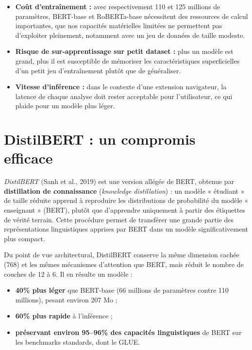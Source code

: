 ﻿\documentclass[12pt, a4paper]{report}
\begin{document}
\begin{itemize}
  \item \textbf{Coût d'entraînement :} avec respectivement 110 et 125 millions de 
        paramètres, BERT-base et RoBERTa-base nécessitent des ressources de calcul 
        importantes, que nos capacités matérielles limitées ne permettent pas 
        d'exploiter pleinement, notamment avec un jeu de données de taille modeste.
  \item \textbf{Risque de sur-apprentissage sur petit dataset :} plus un modèle 
        est grand, plus il est susceptible de mémoriser les caractéristiques 
        superficielles d'un petit jeu d'entraînement plutôt que de généraliser.
  \item \textbf{Vitesse d'inférence :} dans le contexte d'une extension navigateur, 
        la latence de chaque analyse doit rester acceptable pour l'utilisateur, ce 
        qui plaide pour un modèle plus léger.
\end{itemize}

\section{DistilBERT : un compromis efficace}

\textit{DistilBERT} (Sanh et al., 2019) est une version allégée de BERT, obtenue 
par \textbf{distillation de connaissance} (\textit{knowledge distillation}) : un 
modèle « étudiant » de taille réduite apprend à reproduire les distributions de 
probabilité du modèle « enseignant » (BERT), plutôt que d'apprendre uniquement 
à partir des étiquettes de vérité terrain. Cette procédure permet de transférer 
une grande partie des représentations linguistiques apprises par BERT dans un 
modèle significativement plus compact.

Du point de vue architectural, DistilBERT conserve la même dimension cachée 
(768) et les mêmes mécanismes d'attention que BERT, mais réduit le nombre de 
couches de 12 à 6. Il en résulte un modèle :

\begin{itemize}
  \item \textbf{40\% plus léger} que BERT-base (66 millions de paramètres contre 
        110 millions), pesant environ 207 Mo ;
  \item \textbf{60\% plus rapide} à l'inférence ;
  \item \textbf{préservant environ 95--96\% des capacités linguistiques} de BERT 
        sur les benchmarks standards, dont le GLUE.
\end{itemize}
\end{document}
